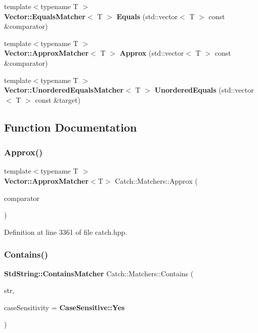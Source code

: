 \begin{DoxyCompactItemize}
\item 
{\footnotesize template$<$typename T $>$ }\\\textbf{ Vector\+::\+Equals\+Matcher}$<$ T $>$ \textbf{ Equals} (std\+::vector$<$ T $>$ const \&comparator)
\item 
{\footnotesize template$<$typename T $>$ }\\\textbf{ Vector\+::\+Approx\+Matcher}$<$ T $>$ \textbf{ Approx} (std\+::vector$<$ T $>$ const \&comparator)
\item 
{\footnotesize template$<$typename T $>$ }\\\textbf{ Vector\+::\+Unordered\+Equals\+Matcher}$<$ T $>$ \textbf{ Unordered\+Equals} (std\+::vector$<$ T $>$ const \&target)
\end{DoxyCompactItemize}


\subsection{Function Documentation}
\mbox{\label{namespace_catch_1_1_matchers_af5b9fe04e095ee688e4058ab27b92e04}} 
\subsubsection{Approx()}
{\footnotesize\ttfamily template$<$typename T $>$ \\
\textbf{ Vector\+::\+Approx\+Matcher}$<$T$>$ Catch\+::\+Matchers\+::\+Approx (\begin{DoxyParamCaption}\item[{std\+::vector$<$ T $>$ const \&}]{comparator }\end{DoxyParamCaption})}



Definition at line 3361 of file catch.\+hpp.

\mbox{\label{namespace_catch_1_1_matchers_a1f6c2accdc6cd75a84d7112dcad647b4}} 
\subsubsection{Contains()\hspace{0.1cm}{\footnotesize\ttfamily [1/2]}}
{\footnotesize\ttfamily \textbf{ Std\+String\+::\+Contains\+Matcher} Catch\+::\+Matchers\+::\+Contains (\begin{DoxyParamCaption}\item[{std\+::string const \&}]{str,  }\item[{\textbf{ Case\+Sensitive\+::\+Choice}}]{case\+Sensitivity = {\ttfamily \textbf{ Case\+Sensitive\+::\+Yes}} }\end{DoxyParamCaption})}

